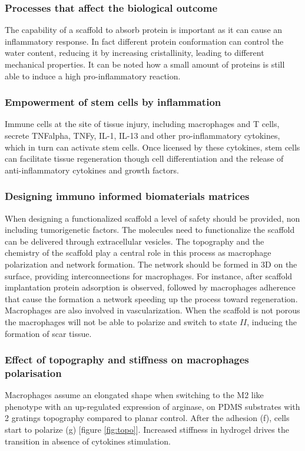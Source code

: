 		\subsubsection{Processes that affect the biological outcome}
		The capability of a scaffold to absorb protein is important as it can cause an inflammatory response.
		In fact different protein conformation can control the water content, reducing it by increasing cristallinity, leading to different mechanical properties.
		It can be noted how a small amount of proteins is still able to induce a high pro-inflammatory reaction.

		\subsubsection{Empowerment of stem cells by inflammation}
		Immune cells at the site of tissue injury, including macrophages and T cells, secrete TNFalpha, TNFy, IL-1, IL-13 and other pro-inflammatory cytokines, which in turn can activate stem cells.
		Once licensed by these cytokines, stem cells can facilitate tissue regeneration though cell differentiation and the release of anti-inflammatory cytokines and growth factors.

		\subsubsection{Designing immuno informed biomaterials matrices}
		When designing a functionalized scaffold a level of safety should be provided, non including tumorigenetic factors.
		The molecules need to functionalize the scaffold can be delivered through extracellular vesicles.
		The topography and the chemistry of the scaffold play a central role in this process as macrophage polarization and network formation.
		The network should be formed in 3D on the surface, providing interconnections for macrophages.
		For instance, after scaffold implantation protein adsorption is observed, followed by macrophages adherence that cause the formation a network speeding up the process toward regeneration.
		Macrophages are also involved in vascularization.
		When the scaffold is not porous the macrophages will not be able to polarize and switch to state $II$, inducing the formation of scar tissue.

		\subsubsection{Effect of topography and stiffness on macrophages polarisation}
		Macrophages assume an elongated shape when switching to the M2 like phenotype with an up-regulated expression of arginase, on PDMS substrates with 2 gratings topography compared to planar control.
		After the adhesion (f), cells start to polarize (g) [figure \ref{fig:topo}].
		Increased stiffness in hydrogel drives the transition in absence of cytokines stimulation.

